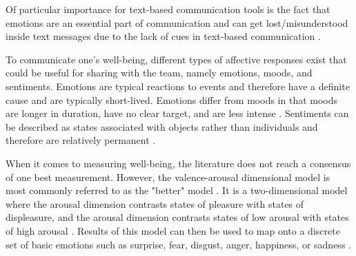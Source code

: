 Of particular importance for text-based communication tools is the fact that emotions are an essential part of communication and can get lost/misunderstood inside text messages due to the lack of cues in text-based communication \autocite{hook2008interactional}.


To communicate one's well-being, different types of affective responses exist that could be useful for sharing with the team, namely emotions, moods, and sentiments. Emotions are typical reactions to events and therefore have a definite cause and are typically short-lived. Emotions differ from moods in that moods are longer in duration, have no clear target, and are less intense \autocite{frijda1994varieties, brave2007emotion}. Sentiments can be described as states associated with objects rather than individuals and therefore are relatively permanent \autocite{brave2007emotion}.

When it comes to measuring well-being, the literature does not reach a consensus of one best measurement. However, the valence-arousal dimensional model is most commonly referred to as the "better" model \autocite{russell1980circumplex, mauss2009measures}. It is a two-dimensional model where the arousal dimension contrasts states of pleasure with states of displeasure, and the arousal dimension contrasts states of low arousal with states of high arousal \autocite{mauss2009measures}. Results of this model can then be used to map onto a discrete set of basic emotions such as surprise, fear, disgust, anger, happiness, or sadness \autocite{brave2007emotion}.